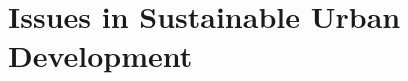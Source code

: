 \documentclass[../main]{subfiles}
\begin{document}
\section{Issues in Sustainable Urban Development}
\end{document}
